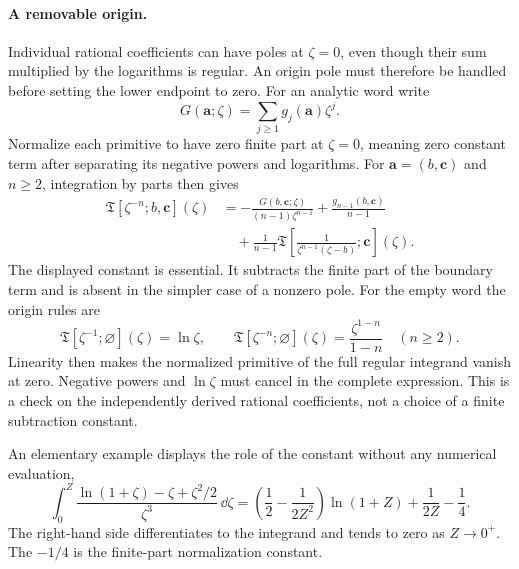 \paragraph{A removable origin.}
Individual rational coefficients can have poles at $\zeta=0$, even though
their sum multiplied by the logarithms is regular. An origin pole must
therefore be handled before setting the lower endpoint to zero. For an
analytic word write
\begin{equation}
 G(\boldsymbol a;\zeta)=\sum_{j\geq1}g_j(\boldsymbol a)\zeta^j.
\end{equation}
Normalize each primitive to have zero finite part at $\zeta=0$, meaning
zero constant term after separating its negative powers and logarithms.
For $\boldsymbol a=(b,\boldsymbol c)$ and $n\geq2$, integration by
parts then gives
\begin{align}
 \mathfrak T[\zeta^{-n};b,\boldsymbol c](\zeta)
 &=-\frac{G(b,\boldsymbol c;\zeta)}{(n-1)\zeta^{n-1}}
 +\frac{g_{n-1}(b,\boldsymbol c)}{n-1}\\
 &\quad+\frac1{n-1}\mathfrak T\!\left[
 \frac1{\zeta^{n-1}(\zeta-b)};\boldsymbol c\right](\zeta).
\end{align}
The displayed constant is essential. It subtracts the finite part of
the boundary term and is absent in the simpler case of a nonzero pole.
For the empty word the origin rules are
\begin{equation}
 \mathfrak T[\zeta^{-1};\varnothing](\zeta)=\ln \zeta,\qquad
 \mathfrak T[\zeta^{-n};\varnothing](\zeta)=\frac{\zeta^{1-n}}{1-n}
 \quad(n\geq2).
\end{equation}
Linearity then makes the normalized primitive of the full regular
integrand vanish at zero. Negative powers and $\ln \zeta$ must cancel in
the complete expression. This is a check on the independently derived
rational coefficients, not a choice of a finite subtraction constant.

An elementary example displays the role of the constant without any
numerical evaluation,
\begin{equation}
 \int_0^Z\frac{\ln(1+\zeta)-\zeta+\zeta^2/2}{\zeta^3}\,\dd\zeta
 =\left(\frac12-\frac1{2Z^2}\right)\ln(1+Z)
 +\frac1{2Z}-\frac14.
\end{equation}
The right-hand side differentiates to the integrand and tends to zero
as $Z\to0^+$. The $-1/4$ is the finite-part normalization constant.

